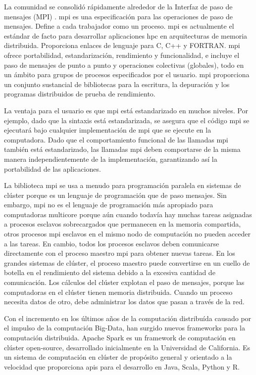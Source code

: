 La comunidad se consolidó rápidamente alrededor de la Interfaz de paso de mensajes (MPI) \cite{gropp1999using}. \acrshort{mpi} es una especificación para las operaciones de paso de mensajes. Define a cada trabajador como un proceso. \acrshort{mpi} es actualmente el estándar de facto para desarrollar aplicaciones \acrshort{hpc} en arquitecturas de memoria distribuida. Proporciona enlaces de lenguaje para C, C++ y FORTRAN. \acrshort{mpi} ofrece portabilidad, estandarización, rendimiento y funcionalidad, e incluye el paso de mensajes de punto a punto y operaciones colectivas (globales), todo en un ámbito para grupos de procesos especificados por el usuario. \acrshort{mpi} proporciona un conjunto sustancial de bibliotecas para la escritura, la depuración y los programas distribuidos de prueba de rendimiento.

La ventaja para el usuario es que \acrshort{mpi} está estandarizado en muchos niveles. Por ejemplo, dado que la sintaxis está estandarizada, se asegura que el código \acrshort{mpi} se ejecutará bajo cualquier implementación de \acrshort{mpi} que se ejecute en la computadora. Dado que el comportamiento funcional de las llamadas \acrshort{mpi} también está estandarizado, las llamadas \acrshort{mpi} deben comportarse de la misma manera independientemente de la implementación, garantizando así la portabilidad de las aplicaciones.

La biblioteca \acrshort{mpi} se usa a menudo para programación paralela en sistemas de clúster porque es un lenguaje de programación que de paso mensajes. Sin embargo, \acrshort{mpi} no es el lenguaje de programación más apropiado para computadoras multicore porque aún cuando todavía hay muchas tareas asignadas a procesos esclavos sobrecargados que permanecen en la memoria compartida, otros procesos \acrshort{mpi} esclavos en el mismo nodo de computación no pueden acceder a las tareas. En cambio, todos los procesos esclavos deben comunicarse directamente con el proceso maestro \acrshort{mpi} para obtener nuevas tareas. En los grandes sistemas de clúster, el proceso maestro puede convertirse en un cuello de botella en el rendimiento del sistema debido a la excesiva cantidad de comunicación. Los cálculos del clúster explotan el paso de mensajes, porque las computadoras en el clúster tienen memoria distribuida. Cuando un proceso necesita datos de otro, debe administrar los datos que pasan a través de la red. 

Con el incremento en los últimos años de la computación distribuída causado por el impulso de la computación Big-Data, han surgido nuevos frameworks para la computación distribuida. Apache Spark \cite{zaharia2016apache} es un framework de computación en clúster open-source, desarrollado inicialmente en la Universidad de California. Es un sistema de computación en clúster de propósito general y orientado a la velocidad que proporciona \acrshort{api}s para el desarrollo en Java, Scala, Python y R.

